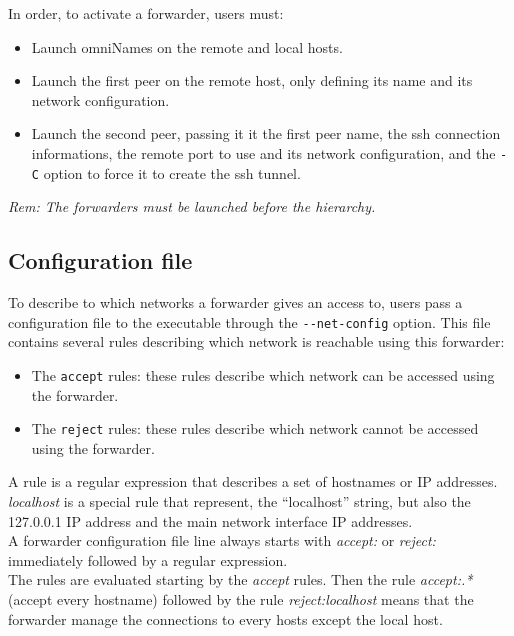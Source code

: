 \noindent In order, to activate a \diet forwarder, users must:
\begin{itemize}
\item Launch omniNames on the remote and local hosts.
\item Launch the first peer on the remote host, only defining its name
  and its network configuration.
\item Launch the second peer, passing it it the first peer name, the
  ssh connection informations, the remote port to use and its network
  configuration, and the \verb#-C# option to force it to create the
  ssh tunnel.
\end{itemize}

\noindent\textit{Rem: The forwarders must be launched before the \diet
  hierarchy.}


\subsection{Configuration file}
To describe to which networks a forwarder gives an access to, users pass a
configuration file to the executable through the \verb#--net-config#
option. This file contains several rules describing which network is
reachable using this forwarder:
\begin{itemize}
\item The \verb#accept# rules: these rules describe which network can
  be accessed using the forwarder.
\item The \verb#reject# rules: these rules describe which network
  cannot be accessed using the forwarder.\\
\end{itemize}

A rule is a regular expression that describes a set of hostnames or IP
addresses. \textit{localhost} is a special rule that represent, the
``localhost'' string, but also the 127.0.0.1 IP address and the main
network interface IP addresses.\\

A \diet forwarder configuration file line always starts with
\textit{accept:} or \textit{reject:} immediately followed by a regular
expression.\\

The rules are evaluated starting by the \textit{accept} rules. Then
the rule \textit{accept:.*} (accept every hostname) followed by the
rule \textit{reject:localhost} means that the forwarder manage the
connections to every hosts except the local host.

